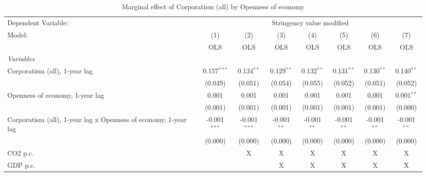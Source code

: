 
\begin{table}[htbp]
   \caption{Marginal effect of Corporatism (all) by Openness of economy}
   \centering
   \begin{tabular}{lccccccc}
      \toprule
      Dependent Variable: & \multicolumn{7}{c}{Stringency value modified}\\
      Model:                                                          & (1)            & (2)            & (3)           & (4)           & (5)           & (6)           & (7)\\  
                                                                      &  OLS           & OLS            & OLS           & OLS           & OLS           & OLS           & OLS\\  
      \midrule
      \emph{Variables}\\
      Corporatism (all), 1-year lag                                   & 0.157$^{***}$  & 0.134$^{**}$   & 0.129$^{**}$  & 0.132$^{**}$  & 0.131$^{**}$  & 0.130$^{**}$  & 0.140$^{**}$\\   
                                                                      & (0.049)        & (0.051)        & (0.054)       & (0.055)       & (0.052)       & (0.051)       & (0.052)\\   
      Openness of economy, 1-year lag                                 & 0.001          & 0.001          & 0.001         & 0.001         & 0.001         & 0.001         & 0.001$^{**}$\\   
                                                                      & (0.001)        & (0.001)        & (0.001)       & (0.001)       & (0.001)       & (0.001)       & (0.000)\\   
      Corporatism (all), 1-year lag x Openness of economy, 1-year lag & -0.001$^{***}$ & -0.001$^{***}$ & -0.001$^{**}$ & -0.001$^{**}$ & -0.001$^{**}$ & -0.001$^{**}$ & -0.001$^{**}$\\   
                                                                      & (0.000)        & (0.000)        & (0.000)       & (0.000)       & (0.000)       & (0.000)       & (0.000)\\   
      CO2 p.c.                                                        &                & X              & X             & X             & X             & X             & X\\  
      GDP p.c.                                                        &                &                & X             & X             & X             & X             & X\\  

\end{tabular}
\end{table}
